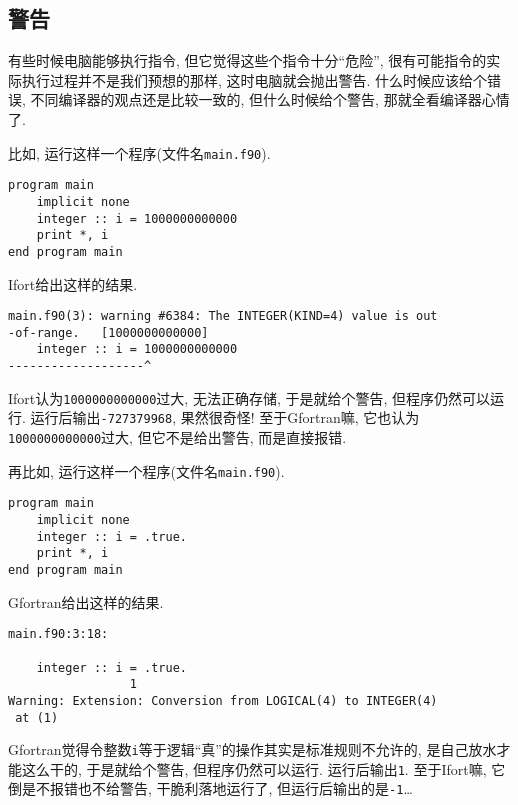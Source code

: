 \subsection{警告}\label{fortran_warning}

有些时候电脑能够执行指令, 但它觉得这些个指令十分``危险'', 很有可能指令的实际执行过程并不是我们预想的那样, 这时电脑就会抛出警告. 什么时候应该给个错误, 不同编译器的观点还是比较一致的, 但什么时候给个警告, 那就全看编译器心情了.

比如, 运行这样一个程序(文件名\verb|main.f90|).
\begin{verbatim}
program main
    implicit none
    integer :: i = 1000000000000
    print *, i
end program main
\end{verbatim}

Ifort给出这样的结果.
\begin{verbatim}
main.f90(3): warning #6384: The INTEGER(KIND=4) value is out
-of-range.   [1000000000000]
    integer :: i = 1000000000000
-------------------^
\end{verbatim}

Ifort认为\verb|1000000000000|过大, 无法正确存储, 于是就给个警告, 但程序仍然可以运行. 运行后输出\verb|-727379968|, 果然很奇怪! 至于Gfortran嘛, 它也认为\verb|1000000000000|过大, 但它不是给出警告, 而是直接报错.

再比如, 运行这样一个程序(文件名\verb|main.f90|).
\begin{verbatim}
program main
    implicit none
    integer :: i = .true.
    print *, i
end program main
\end{verbatim}

Gfortran给出这样的结果.
\begin{verbatim}
main.f90:3:18:

    integer :: i = .true.
                 1
Warning: Extension: Conversion from LOGICAL(4) to INTEGER(4)
 at (1)
\end{verbatim}

Gfortran觉得令整数\verb|i|等于逻辑``真''的操作其实是标准规则不允许的, 是自己放水才能这么干的, 于是就给个警告, 但程序仍然可以运行. 运行后输出\verb|1|. 至于Ifort嘛, 它倒是不报错也不给警告, 干脆利落地运行了, 但运行后输出的是\verb|-1|\dots
